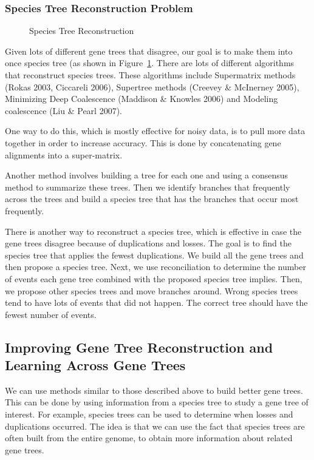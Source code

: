 \subsubsection{Species Tree Reconstruction Problem}

\begin{figure}[H]
  \centering
  \caption{Species Tree Reconstruction} 
  \label{SpeciesTreeReconstruction}
\end{figure}

Given lots of different gene trees that disagree, our goal is to make them into once species tree (as shown in Figure~\ref{SpeciesTreeReconstruction}. There are lots of different algorithms that reconstruct species trees. These algorithms include Supermatrix methods (Rokas 2003, Ciccareli 2006), Supertree methods (Creevey \& McInerney 2005), Minimizing Deep Coalescence (Maddison \& Knowles 2006) and  Modeling coalescence (Liu \& Pearl 2007). 

One way to do this, which is mostly effective for noisy data, is to
pull more data together in order to increase accuracy. This is done by concatenating gene alignments into a super-matrix.

Another method involves building a tree for each one and using a consensus method to summarize these trees. Then we identify branches that frequently across the trees and build a species tree that has the branches that occur most frequently.

There is another way to reconstruct a species tree, which is effective in case the gene trees disagree because of duplications and losses. The goal is to find the species tree that applies the fewest duplications. We build all the gene trees and then propose a species tree. Next, we use reconciliation to determine the number of events each gene tree combined with the proposed species tree implies. Then, we propose other species trees and move branches around. Wrong species trees tend to have lots of events that did not happen. The correct tree should have the fewest number of events. 


\subsection{Improving Gene Tree Reconstruction and Learning Across Gene Trees}
We can use methods similar to those described above to build better gene trees. This can be done by using information from a species tree to study a gene tree of interest. For example, species trees can be used to determine when losses and duplications occurred. The idea is that we can use the fact that species trees are often built from the entire genome, to obtain more information about related gene trees.

